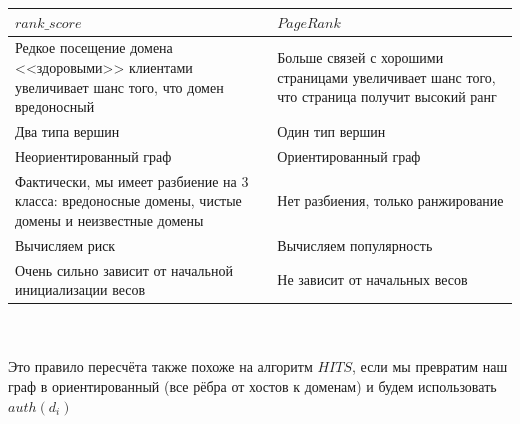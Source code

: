 \documentclass[14pt]{extreport} %
\begin{document}
\begin{tabular}{|p{8cm}|p{8cm}|}
	\hline
	$rank\_score$                                                                                                                                                                       & $PageRank$                                                                                                                                                                  \\ \hline
	Редкое посещение домена <<здоровыми>> клиентами увеличивает шанс того, что домен вредоносный           & Больше связей с хорошими страницами увеличивает шанс того, что страница получит высокий ранг \\ \hline 
	Два типа вершин                                                                                                                                                        & Один тип вершин                                                                                                                                                \\ \hline
	Неориентированный граф                                                                                                                                         & Ориентированный граф                                                                                                                                     \\ \hline
	Фактически, мы имеет разбиение на 3 класса: вредоносные домены, чистые домены и неизвестные домены & Нет разбиения, только ранжирование                                                                                                            \\ \hline
	Вычисляем риск                                                                                                                                                         & Вычисляем популярность                                                                                                                                 \\ \hline
	Очень сильно зависит от начальной инициализации весов                                                                                & Не зависит от начальных весов                                                                                                                      \\ \hline
\end{tabular}
\\ \\
Это правило пересчёта также похоже на алгоритм $HITS$, если мы превратим наш граф в ориентированный (все рёбра от хостов к доменам) и будем использовать $auth(d_i)$
	
\end{document}
